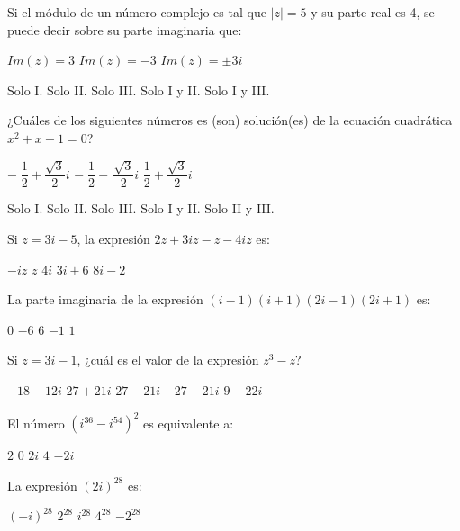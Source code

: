 \documentclass[]{srs}
\begin{document}
\begin{preguntas}[after-item-skip=2cm]
\pregunta Si el módulo de un número complejo es tal que $|z|=5$ y su parte real es 4,
se puede decir sobre su parte imaginaria que:\\
\begin{vertical*}
  \alternativa $Im(z)=3$
  \alternativa $Im(z)=-3$
  \alternativa $Im(z)=\pm 3i$
\end{vertical*}
\begin{vertical}
  \alternativa Solo I.
  \alternativa Solo II.
  \alternativa Solo III.
  \alternativa Solo I y II.
  \alternativa Solo I y III.
\end{vertical}

\pregunta ¿Cuáles de los siguientes números es (son) solución(es) de la ecuación
cuadrática $x^2+x+1=0$?\\
\begin{vertical*}
  \alternativa $-\;\dfrac{1}{2}+\dfrac{\sqrt{3}}{2}i$
  \alternativa $-\;\dfrac{1}{2}-\,\dfrac{\sqrt{3}}{2}i$
  \alternativa $\dfrac{1}{2}+\dfrac{\sqrt{3}}{2}i$
\end{vertical*}
\begin{vertical}
  \alternativa Solo I.
  \alternativa Solo II.
  \alternativa Solo III.
  \alternativa Solo I y II.
  \alternativa Solo II y III.
\end{vertical}

\pregunta Si $z=3i-5$, la expresión $2z+3iz-z-4iz$ es:\\
\begin{vertical}
  \alternativa $-iz$
  \alternativa $z$
  \alternativa $4i$
  \alternativa $3i+6$
  \alternativa $8i-2$
\end{vertical}

\pregunta La parte imaginaria de la expresión
$(i-1)(i+1)(2i-1)(2i+1)$ es:\\
\begin{vertical}
  \alternativa $0$
  \alternativa $-6$
  \alternativa $6$
  \alternativa $-1$
\alternativa $1$
\end{vertical}

\pregunta Si $z=3i-1$, ¿cuál es el valor de la
expresión $z^3-z$?\\
\begin{vertical}
  \alternativa $-18-12i$
  \alternativa $27+21i$
  \alternativa $27-21i$
  \alternativa $-27-21i$
  \alternativa $9-22i$
\end{vertical}


\pregunta El número $(i^{36}-i^{54})^2$ es equivalente a:\\
\begin{vertical}
  \alternativa $2$
  \alternativa $0$
  \alternativa $2i$
  \alternativa $4$
  \alternativa $-2i$
\end{vertical}

\pregunta La expresión $(2i)^{28}$ es:\\
\begin{vertical}
  \alternativa $(-i)^{28}$
  \alternativa $2^{28}$
  \alternativa $i^{28}$
  \alternativa $4^{28}$
  \alternativa $-2^{28}$
\end{vertical}

\end{preguntas}
\end{document}
